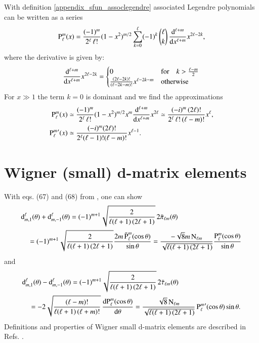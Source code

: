 With definition \eqref{appendix_sfun_assoclegendre}
associated Legendre polynomials can be written as a series
\begin{equation}
\label{appendix_sfun_assoclegendre_expl}
{\text{P}_{\ell}^{m}}(x) = \frac{(-1)^m}{2^\ell\,\ell!} (1-x^2)^{m/2} \sum_{k=0}^\ell (-1)^k \, \binom{\ell}{k} \, \frac{\mathrm{d}^{\ell+m}}{\mathrm{d}x^{\ell+m}} x^{2\ell-2k},
\end{equation}
where the derivative is given by:
\begin{equation}
\label{appendix_sfun_assoclegendre_deriv}
\frac{\mathrm{d}^{\ell+m}}{\mathrm{d}x^{\ell+m}} x^{2\ell-2k} =
\begin{cases}
0 & \text{for} \quad k>\frac{\ell-m}{2} \\
\frac{(2\ell-2k)!}{(\ell-2k-m)!} x^{\ell-2k-m}& \text{otherwise}
\end{cases} 
\end{equation}
For $x\gg 1$ the term $k=0$ is dominant and we find the approximations
\begin{align}
\label{eq:appendix_sfun_assoclegendre_plm_big}
{\text{P}_{\ell}^{m}}(x) &\simeq \frac{(-1)^m}{2^\ell\,\ell!} (1-x^2)^{m/2} x^m \frac{\mathrm{d}^{\ell+m}}{\mathrm{d}x^{\ell+m}} x^{2\ell} \simeq \frac{ (-i)^m \, (2\ell)!}{2^\ell \, \ell! \, (\ell-m)!} x^\ell, \\
\label{eq:appendix_sfun_assoclegendre_dplm_big}
{\text{P}_{\ell}^{m}}^\prime(x) &\simeq \frac{ (-i)^m (2\ell)!}{2^\ell (\ell-1)! (\ell-m)!} x^{\ell-1}.
\end{align}


\section{Wigner (small) d-matrix elements}

With eqs. (67) and (68) from \cite{WignerDfunction}, one can show
\begin{align}
\nonumber
&\mathrm{d}^\ell_{m,1}(\theta) + \mathrm{d}^\ell_{m,-1}(\theta) = (-1)^{m+1} \sqrt{\frac{2}{\ell(\ell+1) \, (2\ell+1)}} \, 2\bar{\pi}_{\ell m}(\theta) \\
\label{eq:appendix_wignerdp}
&\quad= (-1)^{m+1} \sqrt{\frac{2}{\ell(\ell+1) \, (2\ell+1)}} \frac{2m \, {\bar{\text{P}}_{\ell}^{m}}(\cos\theta)}{\sin\theta} = \frac{-\sqrt{8}m \, \text{N}_{\ell m}}{\sqrt{\ell(\ell+1) \, (2\ell+1)}} \frac{{\text{P}_{\ell}^{m}}(\cos\theta)}{\sin\theta}
\end{align}
and
\begin{align}
\nonumber
&\mathrm{d}^\ell_{m,1}(\theta) - \mathrm{d}^\ell_{m,-1}(\theta) = (-1)^{m+1} \sqrt{\frac{2}{\ell(\ell+1) \, (2\ell+1)}} \, 2\bar{\tau}_{\ell m}(\theta) \\
\label{eq:appendix_wignerdm}
&\quad= -2 \sqrt{\frac{(\ell-m)!}{\ell(\ell+1) \, (\ell+m)!}} \, \frac{\mathrm{d}{\text{P}_{\ell}^{m}}(\cos\theta)}{\mathrm{d}\theta} = \frac{\sqrt{8} \, \text{N}_{\ell m}}{\sqrt{\ell(\ell+1) \, (2\ell+1)}} \, {\text{P}_{\ell}^{m}}^\prime(\cos\theta) \sin\theta.
\end{align}
Definitions and properties of Wigner small d-matrix elements are described in Refs. \cite{biedenharn, rose}.


